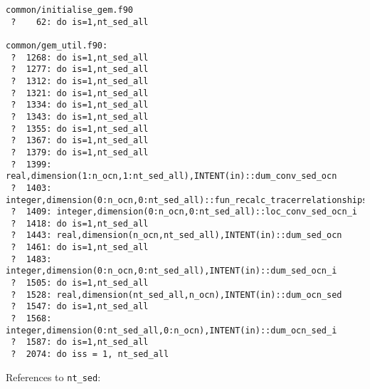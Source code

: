 \documentclass[a4paper,10pt,article]{memoir}
\begin{document}
\begin{small}
\begin{verbatim}
common/initialise_gem.f90
 ?    62: do is=1,nt_sed_all

common/gem_util.f90:
 ?  1268: do is=1,nt_sed_all
 ?  1277: do is=1,nt_sed_all
 ?  1312: do is=1,nt_sed_all
 ?  1321: do is=1,nt_sed_all
 ?  1334: do is=1,nt_sed_all
 ?  1343: do is=1,nt_sed_all
 ?  1355: do is=1,nt_sed_all
 ?  1367: do is=1,nt_sed_all
 ?  1379: do is=1,nt_sed_all
 ?  1399: real,dimension(1:n_ocn,1:nt_sed_all),INTENT(in)::dum_conv_sed_ocn
 ?  1403: integer,dimension(0:n_ocn,0:nt_sed_all)::fun_recalc_tracerrelationships_i
 ?  1409: integer,dimension(0:n_ocn,0:nt_sed_all)::loc_conv_sed_ocn_i
 ?  1418: do is=1,nt_sed_all
 ?  1443: real,dimension(n_ocn,nt_sed_all),INTENT(in)::dum_sed_ocn
 ?  1461: do is=1,nt_sed_all
 ?  1483: integer,dimension(0:n_ocn,0:nt_sed_all),INTENT(in)::dum_sed_ocn_i
 ?  1505: do is=1,nt_sed_all
 ?  1528: real,dimension(nt_sed_all,n_ocn),INTENT(in)::dum_ocn_sed
 ?  1547: do is=1,nt_sed_all
 ?  1568: integer,dimension(0:nt_sed_all,0:n_ocn),INTENT(in)::dum_ocn_sed_i
 ?  1587: do is=1,nt_sed_all
 ?  2074: do iss = 1, nt_sed_all
\end{verbatim}
\end{small}


References to \texttt{nt\_sed}:
\end{document}
